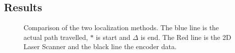 \subsection{Results}


\begin{figure}[H]
\centering
{}
\caption[Comparison of the two localization methods.]{Comparison of the two localization methods. The blue line is the actual path travelled, $*$ is start and $\Delta$ is end. The Red line is the 2D Laser Scanner and the black line the encoder data.}
\label{fig:comparisonOfEncoderVSScanner}
\end{figure}